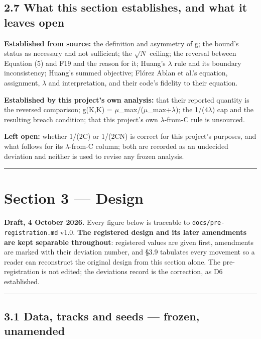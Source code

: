 \documentclass[
  10pt,
]{article}
\begin{document}
\subsection{2.7 What this section establishes, and what it leaves
open}\label{what-this-section-establishes-and-what-it-leaves-open}

\textbf{Established from source:} the definition and asymmetry of g; the
bound's status as necessary and not sufficient; the \(\sqrt{N}\)
ceiling; the reversal between Equation (5) and F19 and the reason for
it; Huang's \(\lambda\) rule and its boundary inconsistency; Huang's
summed objective; Flórez Ablan et al.'s equation, assignment,
\(\lambda\) and interpretation, and their code's fidelity to their
equation.

\textbf{Established by this project's own analysis:} that their reported
quantity is the reversed comparison; g(K,K) =
\(\mu\)\_max/(\(\mu\)\_max+\(\lambda\)); the 1/(4\(\lambda\)) cap and
the resulting breach condition; that this project's own
\(\lambda\)-from-C rule is unsourced.

\textbf{Left open:} whether 1/(2C) or 1/(2CN) is correct for this
project's purposes, and what follows for its \(\lambda\)-from-C column;
both are recorded as an undecided deviation and neither is used to
revise any frozen analysis.

\begin{center}\rule{0.5\linewidth}{0.5pt}\end{center}

\section{Section 3 --- Design}\label{section-3-design}

\textbf{Draft, 4 October 2026.} Every figure below is traceable to
\texttt{docs/\allowbreak{}pre-registration.md} v1.0. \textbf{The registered design
and its later amendments are kept separable throughout}: registered
values are given first, amendments are marked with their deviation
number, and \S{}3.9 tabulates every movement so a reader can reconstruct
the original design from this section alone. The pre-registration is not
edited; the deviations record is the correction, as D6 established.

\begin{center}\rule{0.5\linewidth}{0.5pt}\end{center}

\subsection{3.1 Data, tracks and seeds --- frozen,
unamended}\label{data-tracks-and-seeds-frozen-unamended}
\end{document}
